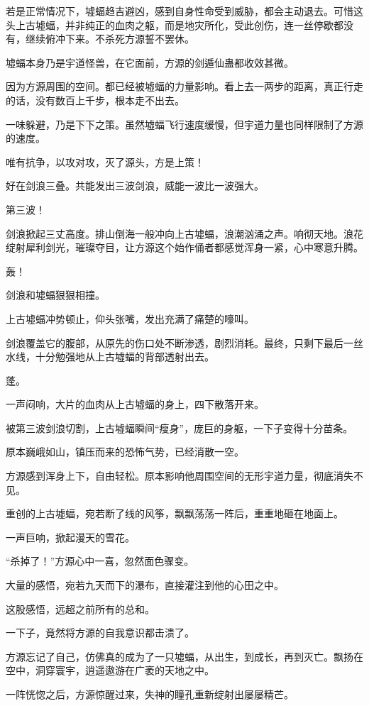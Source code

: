 \begin{this_body}
若是正常情况下，墟蝠趋吉避凶，感到自身性命受到威胁，都会主动退去。可惜这头上古墟蝠，并非纯正的血肉之躯，而是地灾所化，受此创伤，连一丝停歇都没有，继续俯冲下来。不杀死方源誓不罢休。

墟蝠本身乃是宇道怪兽，在它面前，方源的剑遁仙蛊都收效甚微。

因为方源周围的空间。都已经被墟蝠的力量影响。看上去一两步的距离，真正行走的话，没有数百上千步，根本走不出去。

一味躲避，乃是下下之策。虽然墟蝠飞行速度缓慢，但宇道力量也同样限制了方源的速度。

唯有抗争，以攻对攻，灭了源头，方是上策！

好在剑浪三叠。共能发出三波剑浪，威能一波比一波强大。

第三波！

剑浪掀起三丈高度。排山倒海一般冲向上古墟蝠，浪潮汹涌之声。响彻天地。浪花绽射犀利剑光，璀璨夺目，让方源这个始作俑者都感觉浑身一紧，心中寒意升腾。

轰！

剑浪和墟蝠狠狠相撞。

上古墟蝠冲势顿止，仰头张嘴，发出充满了痛楚的嚎叫。

剑浪覆盖它的腹部，从原先的伤口处不断渗透，剧烈消耗。最终，只剩下最后一丝水线，十分勉强地从上古墟蝠的背部透射出去。

蓬。

一声闷响，大片的血肉从上古墟蝠的身上，四下散落开来。

被第三波剑浪切割，上古墟蝠瞬间“瘦身”，庞巨的身躯，一下子变得十分苗条。

原本巍峨如山，镇压而来的恐怖气势，已经消散一空。

方源感到浑身上下，自由轻松。原本影响他周围空间的无形宇道力量，彻底消失不见。

重创的上古墟蝠，宛若断了线的风筝，飘飘荡荡一阵后，重重地砸在地面上。

一声巨响，掀起漫天的雪花。

“杀掉了！”方源心中一喜，忽然面色骤变。

大量的感悟，宛若九天而下的瀑布，直接灌注到他的心田之中。

这股感悟，远超之前所有的总和。

一下子，竟然将方源的自我意识都击溃了。

方源忘记了自己，仿佛真的成为了一只墟蝠，从出生，到成长，再到灭亡。飘扬在空中，洞穿寰宇，逍遥遨游在广袤的天地之中。

一阵恍惚之后，方源惊醒过来，失神的瞳孔重新绽射出屡屡精芒。


\end{this_body}
